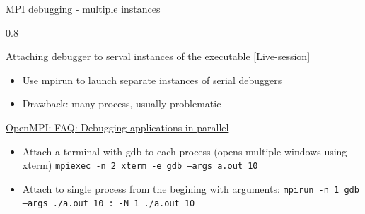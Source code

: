 \documentclass[aspectratio=1610]{beamer}
\newenvironment{centeredblock}[2][0.8\textwidth]
{ %
	\begin{center}
		\begin{varwidth}{#1} %
			\begin{block}{#2}
				\centering
			}
			{ %
			\end{block}
		\end{varwidth}
	\end{center}
}
\begin{document}
	\begin{frame}[fragile]{MPI debugging - multiple instances}
		\begin{centeredblock}{Attaching debugger to serval instances of the executable [Live-session]}
			\begin{itemize}
				\item Use mpirun to launch separate instances of serial debuggers
				\item Drawback: many process, usually problematic
			\end{itemize}
			\href{https://www.open-mpi.org/faq/?category=debugging#serial-debuggers}{OpenMPI: FAQ: Debugging applications in parallel}
			
			\begin{itemize}
				\item Attach a terminal with gdb to each process (opens multiple windows using xterm)
				\texttt{mpiexec -n 2 xterm -e gdb --args a.out 10}
				\item Attach to single process from the begining with arguments: \texttt{mpirun -n 1 gdb --args ./a.out 10 : -N 1 ./a.out 10}
			\end{itemize}
		\end{centeredblock}
	\end{frame}
\end{document}

